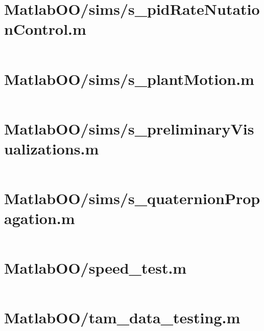 \pagebreak
\section{MatlabOO/sims/s\_pidRateNutationControl.m}\label{code:MatlabOO/sims/s_pidRateNutationControl.m}
\inputminted[linenos,fontsize=\scriptsize]{matlab}{/home/dcouture/git/mathyourlife/TSatPy/beta_versions/matlab_object_oriented/sims/s_pidRateNutationControl.m}

\pagebreak
\section{MatlabOO/sims/s\_plantMotion.m}\label{code:MatlabOO/sims/s_plantMotion.m}
\inputminted[linenos,fontsize=\scriptsize]{matlab}{/home/dcouture/git/mathyourlife/TSatPy/beta_versions/matlab_object_oriented/sims/s_plantMotion.m}

\pagebreak
\section{MatlabOO/sims/s\_preliminaryVisualizations.m}\label{code:MatlabOO/sims/s_preliminaryVisualizations.m}
\inputminted[linenos,fontsize=\scriptsize]{matlab}{/home/dcouture/git/mathyourlife/TSatPy/beta_versions/matlab_object_oriented/sims/s_preliminaryVisualizations.m}

\pagebreak
\section{MatlabOO/sims/s\_quaternionPropagation.m}\label{code:MatlabOO/sims/s_quaternionPropagation.m}
\inputminted[linenos,fontsize=\scriptsize]{matlab}{/home/dcouture/git/mathyourlife/TSatPy/beta_versions/matlab_object_oriented/sims/s_quaternionPropagation.m}

\pagebreak
\section{MatlabOO/speed\_test.m}\label{code:MatlabOO/speed_test.m}
\inputminted[linenos,fontsize=\scriptsize]{matlab}{/home/dcouture/git/mathyourlife/TSatPy/beta_versions/matlab_object_oriented/speed_test.m}

\pagebreak
\section{MatlabOO/tam\_data\_testing.m}\label{code:MatlabOO/tam_data_testing.m}
\inputminted[linenos,fontsize=\scriptsize]{matlab}{/home/dcouture/git/mathyourlife/TSatPy/beta_versions/matlab_object_oriented/tam_data_testing.m}

